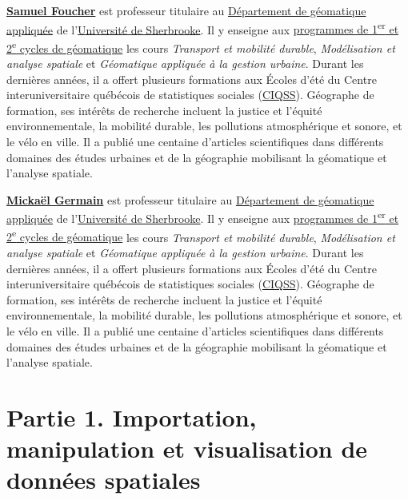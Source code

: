 \documentclass[
  letterpaper,
  DIV=11,
  numbers=noendperiod]{scrreprt}
\begin{document}
\href{https://www.usherbrooke.ca/recherche/fr/specialistes/details/samuel.foucher}{\textbf{Samuel
Foucher}} est professeur titulaire au
\href{https://www.usherbrooke.ca/geomatique/}{Département de géomatique
appliquée} de l'\href{https://www.usherbrooke.ca/}{Université de
Sherbrooke}. Il y enseigne aux
\href{https://www.usherbrooke.ca/geomatique/etudes/programmes}{programmes
de 1\textsuperscript{er} et 2\textsuperscript{e} cycles de géomatique}
les cours \emph{Transport et mobilité durable}, \emph{Modélisation et
analyse spatiale} et \emph{Géomatique appliquée à la gestion urbaine}.
Durant les dernières années, il a offert plusieurs formations aux Écoles
d'été du Centre interuniversitaire québécois de statistiques sociales
(\href{https://www.ciqss.org/}{CIQSS}). Géographe de formation, ses
intérêts de recherche incluent la justice et l'équité environnementale,
la mobilité durable, les pollutions atmosphérique et sonore, et le vélo
en ville. Il a publié une centaine d'articles scientifiques dans
différents domaines des études urbaines et de la géographie mobilisant
la géomatique et l'analyse spatiale.

\href{https://www.usherbrooke.ca/geomatique/departement/personnel/personnel-enseignant/mickael-germain}{\textbf{Mickaël
Germain}} est professeur titulaire au
\href{https://www.usherbrooke.ca/geomatique/}{Département de géomatique
appliquée} de l'\href{https://www.usherbrooke.ca/}{Université de
Sherbrooke}. Il y enseigne aux
\href{https://www.usherbrooke.ca/geomatique/etudes/programmes}{programmes
de 1\textsuperscript{er} et 2\textsuperscript{e} cycles de géomatique}
les cours \emph{Transport et mobilité durable}, \emph{Modélisation et
analyse spatiale} et \emph{Géomatique appliquée à la gestion urbaine}.
Durant les dernières années, il a offert plusieurs formations aux Écoles
d'été du Centre interuniversitaire québécois de statistiques sociales
(\href{https://www.ciqss.org/}{CIQSS}). Géographe de formation, ses
intérêts de recherche incluent la justice et l'équité environnementale,
la mobilité durable, les pollutions atmosphérique et sonore, et le vélo
en ville. Il a publié une centaine d'articles scientifiques dans
différents domaines des études urbaines et de la géographie mobilisant
la géomatique et l'analyse spatiale.

\part{Partie 1. Importation, manipulation et visualisation de données
spatiales}
\end{document}
